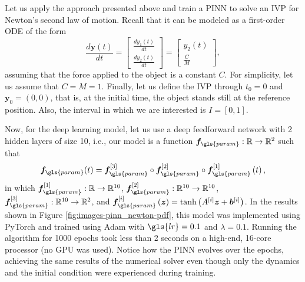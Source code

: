 Let us apply the approach presented above and train a \gls{PINN} to solve an \gls{IVP} for Newton's second law of motion.
Recall that it can be modeled as a first-order \gls{ODE} of the form
\[
    \frac{d \bm{y}(t)}{dt} = \begin{bmatrix} \frac{d y_1(t)}{dt} \\ \frac{d y_2(t)}{dt} \end{bmatrix} = \begin{bmatrix} y_2(t) \\ \frac{C}{M} \end{bmatrix} 
,\]
assuming that the force applied to the object is a constant $C$.
For simplicity, let us assume that $C=M=1$.
Finally, let us define the \gls{IVP} through $t_0=0$ and $\bm{y}_0=\left( 0,0 \right) $, that is, at the initial time, the object stands still at the reference position.
Also, the interval in which we are interested is $I=\left[ 0,1 \right] $.

Now, for the deep learning model, let us use a deep feedforward network with 2 hidden layers of size 10, i.e., our model is a function $\bm{f}_{\gls{param}}:\R\to \R^2$ such that
\[
    \bm{f}_{\gls{param}}(t) = \bm{f}_{\gls{param}}^{[3]} \circ \bm{f}_{\gls{param}}^{[2]} \circ \bm{f}_{\gls{param}}^{[1]} \left( t \right) 
,\] in which $\bm{f}_{\gls{param}}^{[1]}:\R\to \R^{10}$, $\bm{f}_{\gls{param}}^{[2]}:\R^{10}\to \R^{10}$, $\bm{f}_{\gls{param}}^{[3]}:\R^{10}\to \R^2$, and $\bm{f}_{\gls{param}}^{[i]}\left( \bm{z} \right) =\tanh\left( A^{[i]}\bm{z} + \bm{b}^{[i]} \right) $.
In the results shown in Figure \ref{fig:images-pinn_newton-pdf}, this model was implemented using PyTorch \cite{paszke_pytorch_2019} and trained using Adam with $\gls{lr} = 0.1$ and $\lambda=0.1$.
Running the algorithm for 1000 epochs took less than 2 seconds on a high-end, 16-core processor (no GPU was used).
Notice how the \gls{PINN} evolves over the epochs, achieving the same results of the numerical solver even though only the dynamics and the initial condition were experienced during training.

